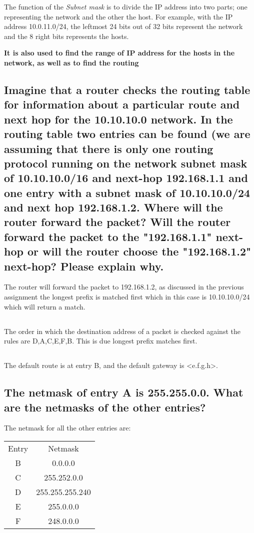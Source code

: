 \documentclass{article}
\begin{document}
The function of the {\textit{Subnet mask}} is to divide the IP address into two parts; one representing the network and the other the host. For example, with the IP address 10.0.11.0/24, the leftmost 24 bits out of 32 bits represent the network and the 8 right bits represents the hosts. 

\textbf{It is also used to find the range of IP address for the hosts in the network, as well as to find the routing}


\subsection{Imagine that a router checks the routing table for information about a particular route and next hop for the 10.10.10.0 network. In the routing table two entries can be found (we are assuming that there is only one routing protocol running on the network subnet mask of 10.10.10.0/16 and next-hop 192.168.1.1 and one entry with a subnet mask of 10.10.10.0/24 and next hop 192.168.1.2. Where will the router forward the packet? Will the router forward the packet to the "192.168.1.1" next-hop or will the router choose the "192.168.1.2" next-hop? Please explain why.}

The router will forward the packet to 192.168.1.2, as discussed in the previous assignment the  longest prefix is matched first which in this case is 10.10.10.0/24 which will return a match.


\subsection{}
The order in which the destination address of a packet is checked against the rules are D,A,C,E,F,B. This is due longest prefix matches first.


\subsection{}
The default route is at entry B, and the default gateway is <e.f.g.h>.



\subsection{The netmask of entry A is 255.255.0.0. What are the netmasks of the other entries?}

The netmask for all the other entries are: \\
\begin{table}[!h]
\begin{tabular}{c|c}
    Entry & Netmask  \\
    B & 0.0.0.0 \\
    C & 255.252.0.0 \\
    D & 255.255.255.240 \\
    E & 255.0.0.0 \\
    F & 248.0.0.0 
\end{tabular}
\end{table}
\end{document}

